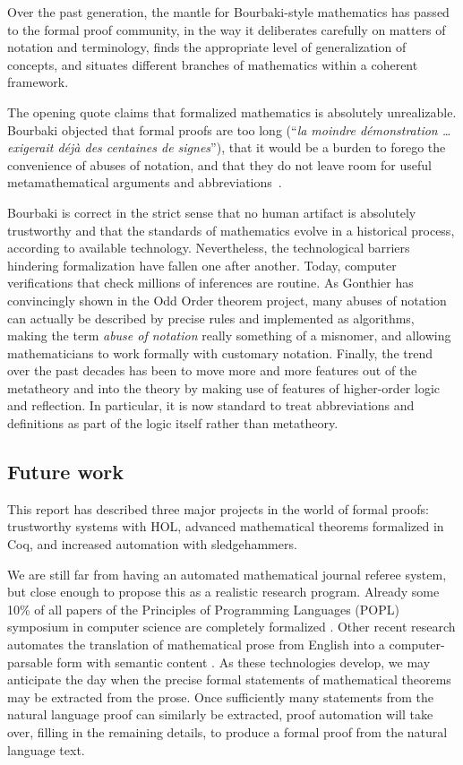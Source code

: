 \documentclass[brochure,english,12pt]{bourbaki}
\theoremstyle{plain}
\begin{document}
Over the past generation, the mantle for Bourbaki-style mathematics
has passed to the formal proof community, in the way it deliberates
carefully on matters of notation and terminology, finds the appropriate
level of generalization of concepts, and situates
different branches of mathematics within a coherent framework.

The opening quote claims that formalized mathematics is absolutely
unrealizable.  Bourbaki objected that formal proofs are too long
(``{\it la moindre d\'emonstration \ldots exigerait d\'ej\`a des
  centaines de signes}''), that it would be a burden to forego the
convenience of abuses of notation, and that they do not leave room for
useful metamathematical arguments and
abbreviations~\cite{bourbaki1966theorie}.

Bourbaki is correct in the strict sense that no human artifact is
absolutely trustworthy and that the standards of mathematics evolve in
a historical process, according to available technology.
Nevertheless, the technological barriers hindering formalization have
fallen one after another.  Today, computer verifications that check
millions of inferences are routine.  As Gonthier has convincingly
shown in the Odd Order theorem project, many abuses of notation can
actually be described by precise rules and implemented as algorithms,
making the term {\it abuse of notation} really something of a
misnomer, and allowing mathematicians to work formally with
customary notation.  Finally, the trend over the past decades has been
to move more and more features out of the metatheory and into the
theory by making use of features of higher-order logic and reflection.  In
particular, it is now standard to treat abbreviations and definitions
as part of the logic itself rather than metatheory.

\subsection{Future work}

This report has described three major projects in the world of formal
proofs: trustworthy systems with HOL, advanced mathematical theorems
formalized in Coq, and increased automation with sledgehammers.

We are still far from having an automated mathematical journal referee
system, but close enough to propose this as a realistic research
program.  Already some 10\% of all papers of the Principles of
Programming Languages (POPL) symposium in computer science are
completely formalized \cite{SewPOPL2014}.  Other recent research automates the
translation of mathematical prose from English into a
computer-parsable form with semantic content
\cite{ganesalingam2013language}.  As these technologies develop, we
may anticipate the day when the precise formal statements of
mathematical theorems may be extracted from the prose.  Once
sufficiently many statements from the natural language proof can
similarly be extracted, proof automation will take over, filling in
the remaining details, to produce a formal proof from the natural
language text.
\end{document}
